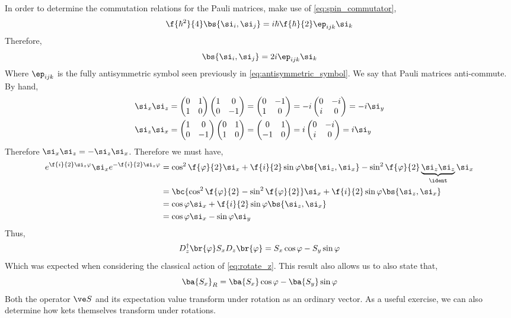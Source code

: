 \documentclass{article}
\begin{document}
In order to determine the commutation relations for the Pauli matrices, make use of \cref{eq:spin_commutator},
\[ \f{\hbar^2}{4}\bs{\si_i, \si_j} = i \hbar \f{\hbar}{2} \ep_{ijk} \si_k \]
Therefore,
\[ \bs{\si_i, \si_j} = 2i\ep_{ijk} \si_k \]
Where $\ep_{ijk}$ is the fully antisymmetric symbol seen previously in \cref{eq:antisymmetric_symbol}. We say that Pauli matrices anti-commute. By hand,
\begin{align*}
\si_x \si_z &= \begin{pmatrix}0 & 1 \\ 1 & 0 \end{pmatrix}\begin{pmatrix}1 & 0 \\ 0 & -1 \end{pmatrix} = \begin{pmatrix}0 & -1 \\ 1 & 0 \end{pmatrix} = -i\begin{pmatrix}0 & -i \\ i & 0 \end{pmatrix} = -i \si_y \\
\si_z \si_x &= \begin{pmatrix}1 & 0 \\ 0 & -1 \end{pmatrix}\begin{pmatrix}0 & 1 \\ 1 & 0 \end{pmatrix} = \begin{pmatrix}0 & 1 \\ -1 & 0 \end{pmatrix} = i\begin{pmatrix}0 & -i \\ i & 0 \end{pmatrix} = i \si_y
\end{align*}
Therefore $\si_x \si_z = - \si_z \si_x$. Therefore we must have,
\begin{align*}
    e^{\f{i}{2} \si_z \varphi } \si_x e^{-\f{i}{2} \si_z \varphi }
    &= \cos^2 \f{\varphi}{2} \si_x + \f{i}{2} \sin \varphi \bs{\si_z, \si_x}- \sin^2 \f{\varphi}{2} \underbrace{\si_z \si_z}_{\ident} \si_x  \\
    &= \bc{\cos^2 \f{\varphi}{2} - \sin^2 \f{\varphi}{2}} \si_x + \f{i}{2} \sin \varphi \bs{\si_z, \si_x} \\
    &= \cos \varphi \si_x + \f{i}{2} \sin \varphi \bs{\si_z, \si_x} \\
    &= \cos \varphi \si_x - \sin \varphi \si_y
\end{align*}
Thus,
\[ D^{\dagger}_z\br{\varphi} S_x D_z\br{\varphi} = S_x \cos \varphi - S_y \sin \varphi \]
Which was expected when considering the classical action of \cref{eq:rotate_z}. This result also allows us to also state that,
\[ \ba{S_x}_R = \ba{S_x} \cos \varphi - \ba{S_y} \sin \varphi \]
Both the operator $\ve S$ and its expectation value transform under rotation as an ordinary vector. As a useful exercise, we can also determine how kets themselves transform under rotations.
\end{document}
